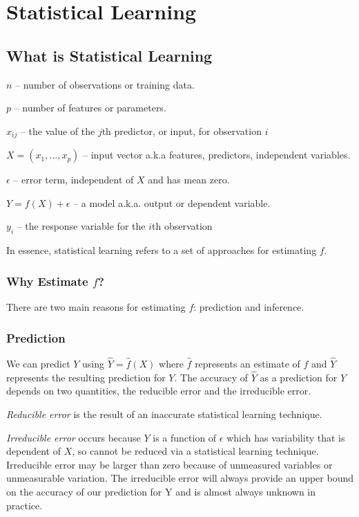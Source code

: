 \documentclass{article}
\numberwithin{equation}{section}
\begin{document}
\newpage
\section{Statistical Learning}
\subsection{What is Statistical Learning}
$n$ -- number of observations or training data.

$p$ -- number of features or parameters.

$x_{ij}$ -- the value of the $j$th predictor, or input, for observation $i$

$X = (x_1, \dots, x_p)$  -- input vector a.k.a features, predictors, independent variables.

$\epsilon$  -- error term, independent of $X$ and has mean zero.

$Y = f(X) + \epsilon$ -- a model a.k.a. output or dependent variable.

$y_i$ -- the response variable for the $i$th observation

In essence, statistical learning refers to a set of approaches for estimating $f$. 

\subsubsection{Why Estimate \texorpdfstring{$f$}{f}?}
There are two main reasons for estimating $f$: prediction and inference. 

\subsubsection*{Prediction}

We can predict $Y$ using $\hat Y = \hat f(X)$ where $\hat f$ represents an estimate of $f$ and $\hat Y$ represents the resulting prediction for $Y$. The accuracy of $\hat Y$ as a prediction for $Y$ depends on two quantities, the reducible error and the irreducible error. 

\textit{Reducible error} is the result of an inaccurate statistical learning technique.

\textit{Irreducible error} occurs because $Y$ is a function of $\epsilon$ which has variability that is dependent of $X$, so cannot be reduced via a statistical learning technique. Irreducible error may be larger than zero because of unmeasured variables or unmeasurable variation. The irreducible error will always provide an upper bound on the accuracy of our prediction for Y and is almost always unknown in practice.
\end{document}
